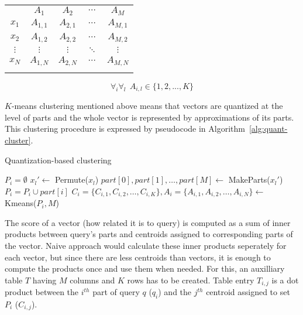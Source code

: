 \begin{center}
\renewcommand{\arraystretch}{1.2}
\begin{tabular}{c|c|c|c|c|}
\multicolumn{1}{r}{} & \multicolumn{1}{c}{$A_{1}$} & \multicolumn{1}{c}{$A_{2}$}
& \multicolumn{1}{c}{$\cdots$} & \multicolumn{1}{c}{$A_{M}$} \\
\hhline{~----}
$x_1$ & $A_{1,1}$ & $A_{2,1}$ & $\cdots$ & $A_{M,1}$ \\
\hhline{~----}
$x_2$ & $A_{1,2}$ & $A_{2,2}$ & $\cdots$ & $A_{M,2}$ \\
\hhline{~----}
$\vdots$ & $\vdots$ & $\vdots$ & $\ddots$ & $\vdots$ \\
\hhline{~----}
$x_N$ & $A_{1,N}$ & $A_{2,N}$ & $\cdots$ & $A_{M,N}$ \\
\hhline{~----}
\end{tabular}
\end{center}

\begin{equation*}
\forall_i \forall_l\ \  A_{i,l} \in \{1,2,...,K\}
\end{equation*}

$K$-means clustering mentioned above means that vectors are quantized at the level of parts
and the whole vector is represented by approximations of its parts.
This clustering procedure is expressed by pseudocode in Algorithm~\ref{alg:quant-cluster}.

\begin{algorithm}
	\caption{Quantization-based clustering}
	\begin{algorithmic}
			\State $P_i = \emptyset$
		\EndFor
			\State $x_l' \gets$ Permute($x_l$)
			\State $part[0], part[1], \dots, part[M] \gets$ MakeParts($x_l'$)
				\State $P_i = P_i \cup part[i]$
			\EndFor
		\EndFor
			\State $C_i = \{C_{i,1}, C_{i,2}, \dots, C_{i,K}\}, A_i = \{A_{i,1}, A_{i,2}, \dots, A_{i,N}\} \gets$ Kmeans($P_i, M$)
		\EndFor
	\end{algorithmic}
\label{alg:quant-cluster}
\end{algorithm}

The score of a vector (how related it is to query) is computed as a sum of inner products
between query's parts and centroids assigned to corresponding parts of the vector.
Naive approach would calculate these inner products seperately for each vector,
but since there are less centroids than vectors, it is enough to compute the products once
and use them when needed.
For this, an auxilliary table $T$ having $M$ columns and $K$ rows has to be created.
Table entry $T_{i,j}$ is a dot product between the $i^{th}$ part of query $q$ ($q_i$) and the $j^{th}$
centroid assigned to set $P_i$ ($C_{i,j}$).

